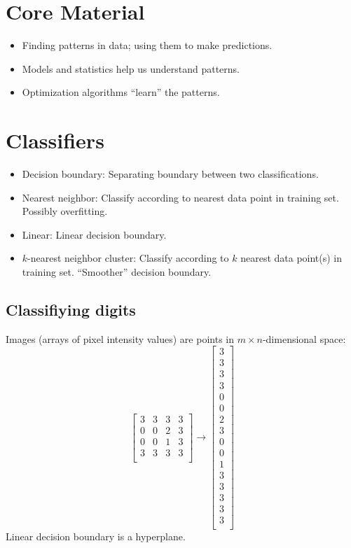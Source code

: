 \documentclass{article}
\begin{document}
\section{Core Material}
\begin{itemize}
\item Finding patterns in data; using them to make predictions.
\item Models and statistics help us understand patterns.
\item Optimization algorithms ``learn'' the patterns.
\end{itemize}
\section{Classifiers}
\begin{itemize}
\item Decision boundary: Separating boundary between two classifications.
\item Nearest neighbor: Classify according to nearest data point in training set. Possibly overfitting.
\item Linear: Linear decision boundary.
\item \(k\)-nearest neighbor cluster: Classify according to \(k\) nearest data point(s) in training set.  ``Smoother'' decision boundary.
\end{itemize}
\subsection{Classifiying digits}
Images (arrays of pixel intensity values) are points in \(m \times n\)-dimensional space:
\[\begin{bmatrix}
3 & 3 & 3 & 3\\
0 & 0 & 2 & 3\\
0 & 0 & 1 & 3\\
3 & 3 & 3 & 3\\
\end{bmatrix}
\rightarrow
\begin{bmatrix}
3\\
3\\
3\\
3\\
0\\
0\\
2\\
3\\
0\\
0\\
1\\
3\\
3\\
3\\
3\\
3\\
\end{bmatrix}
\]
Linear decision boundary is a hyperplane.
\end{document}
